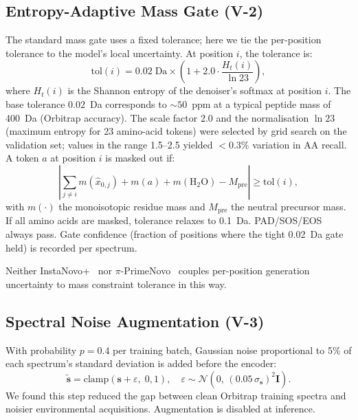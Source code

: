\documentclass[11pt]{article}
\begin{document}
\subsection{Entropy-Adaptive Mass Gate (V-2)}

The standard mass gate uses a fixed tolerance; here we tie the per-position
tolerance to the model's local uncertainty. At position $i$, the tolerance is:
\begin{equation}
  \text{tol}(i) = 0.02\;\text{Da} \times
  \left(1 + 2.0 \cdot \frac{H_t(i)}{\ln 23}\right),
\end{equation}
where $H_t(i)$ is the Shannon entropy of the denoiser's softmax at position $i$.
The base tolerance $0.02$~Da corresponds to $\sim\!50$~ppm at a typical peptide mass
of 400~Da (Orbitrap accuracy). The scale factor 2.0 and the normalisation $\ln 23$
(maximum entropy for 23 amino-acid tokens) were selected by grid search on the
validation set; values in the range 1.5--2.5 yielded $<\!0.3\%$ variation in AA recall.
A token $a$ at position $i$ is masked out if:
\begin{equation}
  \left|\sum_{j \neq i} m(\hat{x}_{0,j}) + m(a) + m(\mathrm{H_2O})
  - M_\text{pre}\right| \geq \text{tol}(i),
\end{equation}
with $m(\cdot)$ the monoisotopic residue mass and $M_\text{pre}$ the neutral
precursor mass. If all amino acids are masked, tolerance relaxes to 0.1~Da.
PAD/SOS/EOS always pass. Gate confidence (fraction of positions where the
tight 0.02~Da gate held) is recorded per spectrum.

Neither InstaNovo+~\cite{instanovo} nor $\pi$-PrimeNovo~\cite{primenovo} couples
per-position generation uncertainty to mass constraint tolerance in this way.

\subsection{Spectral Noise Augmentation (V-3)}

With probability $p=0.4$ per training batch, Gaussian noise proportional to
5\% of each spectrum's standard deviation is added before the encoder:
\begin{equation}
  \tilde{\mathbf{s}} = \mathrm{clamp}\!\left(
  \mathbf{s} + \varepsilon,\; 0, 1\right),
  \quad \varepsilon \sim \mathcal{N}(0,\,(0.05\,\sigma_\mathbf{s})^2\mathbf{I}).
\end{equation}
We found this step reduced the gap between clean Orbitrap training spectra and noisier
environmental acquisitions. Augmentation is disabled at inference.
\end{document}
